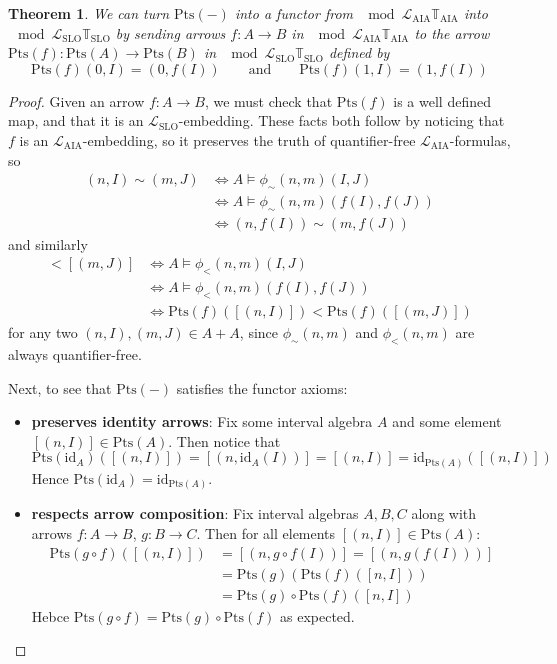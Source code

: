 \documentclass[11pt %
              ]{article}
\newcommand{\id}[1]{\text{id}_{#1}}
\newcommand{\lang}{\mathcal{L}}
\newcommand{\theory}{\mathbb{T}}
\newcommand{\lslo}{\lang_\text{SLO}}
\newcommand{\tslo}{\theory_\text{SLO}}
\newcommand{\laia}{\lang_\text{AIA}}
\newcommand{\taia}{\theory_\text{AIA}}
\newcommand{\psim}{\sim}
\newcommand{\peq}{\phi_\sim}
\newcommand{\plt}{\phi_<}
\newcommand{\points}[1][-]{\text{Pts}\left(#1\right)}
\theoremstyle{plain}
\newtheorem{thm}{Theorem}%
\theoremstyle{definition}
\theoremstyle{remark}
\begin{document}
\begin{thm}
  We can turn $\points$ into a functor from $\mod{\laia}{\taia}$ into
  $\mod{\lslo}{\tslo}$ by sending arrows $f : A \to B$ in $\mod{\laia}{\taia}$ to the arrow
  $\points[f] : \points[A] \to \points[B]$ in $\mod{\lslo}{\tslo}$ defined by
  \begin{equation*}
    \points[f](0, I) = (0, f(I)) \qquad\text{and}\qquad \points[f](1,I) = (1, f(I))
  \end{equation*}
\end{thm}
\begin{proof}
  Given an arrow $f : A \to B$, we must check that $\points[f]$ is a well defined map, and that it
  is an $\lslo$-embedding. These facts both follow by noticing that $f$ is an
  $\laia$-embedding, so it preserves the truth of quantifier-free $\laia$-formulas, so
  \begin{align*}
    (n,I) \psim (m,J)
      & \iff A \models \peq(n,m)(I,J) \\
      & \iff A \models \peq(n,m)(f(I),f(J)) \\
      & \iff (n,f(I)) \psim (m,f(J))
  \end{align*}
  and similarly
  \begin{align*}
    [(n,I)] < [(m,J)]
      & \iff A \models \plt(n,m)(I,J) \\
      & \iff A \models \plt(n,m)(f(I),f(J)) \\
      & \iff \points[f]([(n,I)]) < \points[f]([(m,J)])
  \end{align*}
  for any two $(n,I),(m,J) \in A + A$, since $\peq(n,m)$ and $\plt(n,m)$ are always quantifier-free.

  Next, to see that $\points$ satisfies the functor axioms:
  \begin{itemize}
    \item \textbf{preserves identity arrows}: Fix some interval algebra $A$ and some element
    $[(n, I)] \in \points[A]$. Then notice that
      \begin{equation*}
        \points[\id{A}]([(n,I)]) = [(n, \id{A}(I))] = [(n,I)] = \id{\points[A]}([(n,I)])
      \end{equation*}
      Hence $\points[\id{A}] = \id{\points[A]}$.
    \item \textbf{respects arrow composition}: Fix interval algebras $A,B,C$ along with arrows
      $f : A \to B$, $g : B \to C$. Then for all elements $[(n,I)] \in \points[A]$:
      \begin{align*}
        \points[g \circ f]([(n,I)])
          & = [(n,g \circ f (I))] = [(n, g(f(I)))] \\
          & = \points[g]\left( \points[f]([n,I]) \right) \\
          & = \points[g] \circ \points[f] ([n,I])
      \end{align*}
      Hebce $\points[g \circ f] = \points[g] \circ \points[f]$ as expected.
  \end{itemize}
\end{proof}
\end{document}
